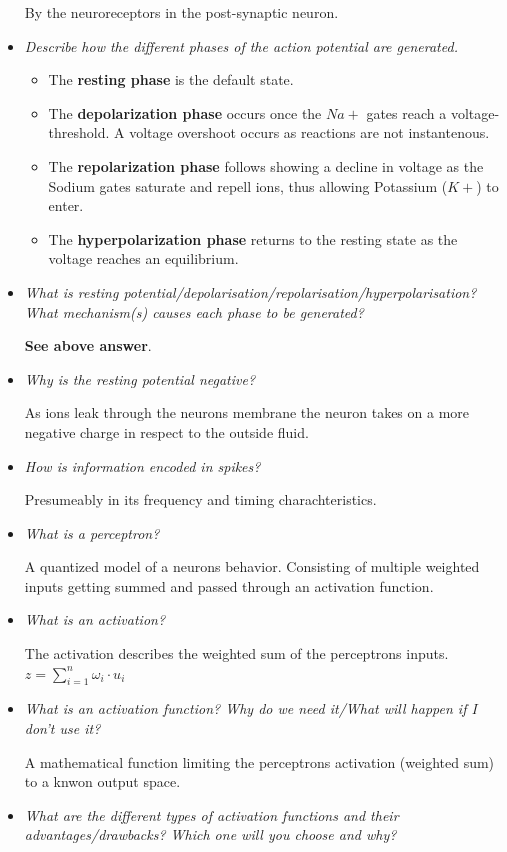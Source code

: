 \documentclass[
    fontsize      = 11pt,
    paper         = a4,
    twoside       = false,
    parskip       = half,
    pagesize      = false,
]{scrartcl}
\providecommand{\tightlist}{%
  \setlength{\itemsep}{0pt}\setlength{\parskip}{0pt}}
\begin{document}
\begin{itemize}
  By the neuroreceptors in the post-synaptic neuron.
\item
  \emph{Describe how the different phases of the action potential are
  generated.}

  \begin{itemize}
  \tightlist
  \item
    The \textbf{resting phase} is the default state.
  \item
    The \textbf{depolarization phase} occurs once the \(Na+\) gates
    reach a voltage-threshold. A voltage overshoot occurs as reactions
    are not instantenous.
  \item
    The \textbf{repolarization phase} follows showing a decline in
    voltage as the Sodium gates saturate and repell ions, thus allowing
    Potassium (\(K+\)) to enter.
  \item
    The \textbf{hyperpolarization phase} returns to the resting state as
    the voltage reaches an equilibrium.
  \end{itemize}
\item
  \emph{What is resting
  potential/depolarisation/repolarisation/hyperpolarisation? What
  mechanism(s) causes each phase to be generated?}

  \textbf{See above answer}.
\item
  \emph{Why is the resting potential negative?}

  As ions leak through the neurons membrane the neuron takes on a more
  negative charge in respect to the outside fluid.
\item
  \emph{How is information encoded in spikes?}

  Presumeably in its frequency and timing charachteristics.
\item
  \emph{What is a perceptron?}

  A quantized model of a neurons behavior. Consisting of multiple
  weighted inputs getting summed and passed through an activation
  function.
\item
  \emph{What is an activation?}

  The activation describes the weighted sum of the perceptrons inputs.
  \(z = \sum_{i=1}^n \omega_i \cdot u_i\)
\item
  \emph{What is an activation function? Why do we need it/What will
  happen if I don't use it?}

  A mathematical function limiting the perceptrons activation (weighted
  sum) to a knwon output space.
\item
  \emph{What are the different types of activation functions and their
  advantages/drawbacks? Which one will you choose and why?}


\end{itemize}
\end{document}
